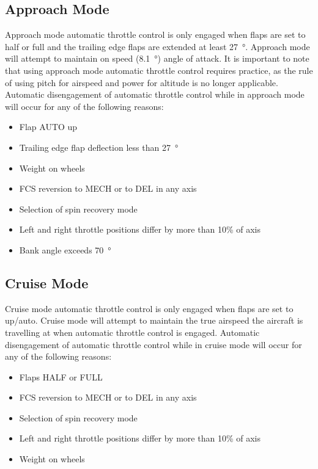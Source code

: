 \documentclass[11pt]{report}
\begin{document}
\subsection{Approach Mode}

Approach mode automatic throttle control is only engaged when flaps are set to half or full and the trailing edge flaps are extended at least \SI{27}{\degree}.  Approach mode will attempt to maintain on speed (\SI{8.1}{\degree}) angle of attack.  It is important to note that using approach mode automatic throttle control requires practice, as the rule of using pitch for airspeed and power for altitude is no longer applicable.  Automatic disengagement of automatic throttle control while in approach mode will occur for any of the following reasons:

\begin{itemize}
\item Flap AUTO up
\item Trailing edge flap deflection less than \SI{27}{\degree}
\item Weight on wheels
\item FCS reversion to MECH or to DEL in any axis
\item Selection of spin recovery mode
\item Left and right throttle positions differ by more than 10\% of axis
\item Bank angle exceeds \SI{70}{\degree}
\end{itemize}

\subsection{Cruise Mode}
Cruise mode automatic throttle control is only engaged when flaps are set to up/auto.  Cruise mode will attempt to maintain the true airspeed the aircraft is travelling at when automatic throttle control is engaged.  Automatic disengagement of automatic throttle control while in cruise mode will occur for any of the following reasons:

\begin{itemize}
\item Flaps HALF or FULL
\item FCS reversion to MECH or to DEL in any axis
\item Selection of spin recovery mode
\item Left and right throttle positions differ by more than 10\% of axis
\item Weight on wheels
\end{itemize}
\end{document}
